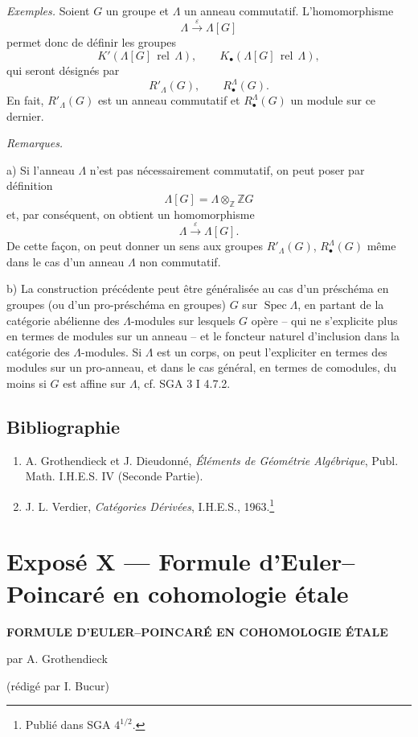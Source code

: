 \documentclass[11pt]{article}
\DeclareMathOperator{\Spec}{Spec}
\providecommand{\Spec}{\operatorname{Spec}}
\providecommand{\Spec}{\operatorname{Spec}}
\providecommand{\Spec}{\operatorname{Spec}}
\begin{document}
\emph{Exemples.} Soient $G$ un groupe et $\Lambda$ un anneau commutatif. L'homomorphisme
\[
\Lambda\xrightarrow{\varepsilon}\Lambda[G]
\]
permet donc de définir les groupes
\[
K'(\Lambda[G]\operatorname{\,rel\,}\Lambda),\qquad
K_\bullet(\Lambda[G]\operatorname{\,rel\,}\Lambda),
\]
qui seront désignés par
\[
R'_\Lambda(G),\qquad R^\Lambda_\bullet(G).
\]
En fait, $R'_\Lambda(G)$ est un anneau commutatif et $R^\Lambda_\bullet(G)$ un module sur ce dernier.

\emph{Remarques.}

a) Si l'anneau $\Lambda$ n'est pas nécessairement commutatif, on peut poser par définition
\[
\Lambda[G]=\Lambda\otimes_{\mathbb Z}\mathbb ZG
\]
et, par conséquent, on obtient un homomorphisme
\[
\Lambda\xrightarrow{\varepsilon}\Lambda[G].
\]
De cette façon, on peut donner un sens aux groupes $R'_\Lambda(G)$, $R^\Lambda_\bullet(G)$ même dans le cas d'un anneau $\Lambda$ non commutatif.

b) La construction précédente peut être généralisée au cas d'un préschéma en groupes (ou d'un pro-préschéma en groupes) $G$ sur $\Spec\Lambda$, en partant de la catégorie abélienne des $\Lambda$-modules sur lesquels $G$ opère -- qui ne s'explicite plus en termes de modules sur un anneau -- et le foncteur naturel d'inclusion dans la catégorie des $\Lambda$-modules. Si $\Lambda$ est un corps, on peut l'expliciter en termes des modules sur un pro-anneau, et dans le cas général, en termes de comodules, du moins si $G$ est affine sur $\Lambda$, cf. SGA 3 I 4.7.2.

\subsection*{Bibliographie}

\begin{enumerate}
\item[{[1]}] A. Grothendieck et J. Dieudonné, \emph{Éléments de Géométrie Algébrique}, Publ. Math. I.H.E.S. IV (Seconde Partie).
\item[{[2]}] J. L. Verdier, \emph{Catégories Dérivées}, I.H.E.S., 1963.\footnote{Publié dans SGA $4^{1/2}$.}
\end{enumerate}

\section*{Exposé X --- Formule d'Euler--Poincaré en cohomologie étale}

\begin{center}
\textbf{FORMULE D'EULER--POINCARÉ EN COHOMOLOGIE ÉTALE}

par A. Grothendieck

(rédigé par I. Bucur)
\end{center}
\end{document}
